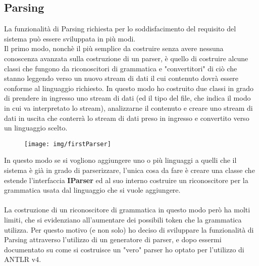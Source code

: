 \documentclass{article}
\begin{document}
  \subsection{Parsing}
  La funzionalità di Parsing richiesta per lo soddisfacimento del requisito del sistema può essere sviluppata in più modi.\\Il primo modo, nonchè il più
  semplice da costruire senza avere nessuna conoscenza avanzata sulla costruzione di un parser, è quello di costruire alcune classi che fungono da riconoscitori di
  grammatica e "convertitori" di ciò che stanno leggendo verso un nuovo stream di dati il cui contenuto dovrà essere conforme al linguaggio richiesto. In questo
  modo ho costruito due classi in grado di prendere in ingresso uno stream di dati (ed il tipo del file, che indica il modo in cui va interpretato lo stream),
  analizzarne il contenuto e creare uno stream di dati in uscita che conterrà lo stream di dati preso in ingresso e convertito verso un linguaggio scelto.
  \begin{figure}[h]
    \centering
    \texttt{[image: img/firstParser]}
  \end{figure}
  In questo modo se si vogliono aggiungere uno o più linguaggi a quelli che il sistema è già in grado di parserizzare, l'unica cosa da fare è creare una classe
  che estende l'interfaccia \textbf{IParser} ed al suo interno costruire un riconoscitore per la grammatica usata dal linguaggio che si vuole aggiungere.\\
  \\La costruzione di un riconoscitore di  grammatica in questo modo però ha molti limiti, che si evidenziano all'aumentare dei possibili token che la grammatica
  utilizza. Per questo motivo (e non solo) ho deciso di sviluppare la funzionalità di Parsing attraverso l'utilizzo di un generatore di parser, e dopo essermi
  documentato su come si costruisce un "vero" parser ho optato per l'utilizzo di ANTLR v4.
\end{document}
